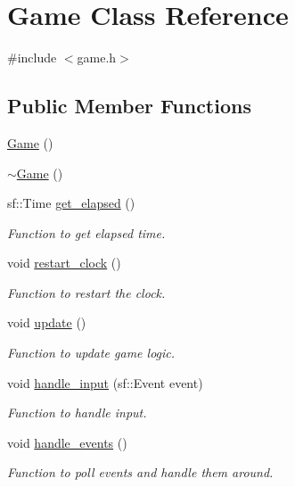\hypertarget{class_game}{}\section{Game Class Reference}
\label{class_game}


{\ttfamily \#include $<$game.\+h$>$}

\subsection*{Public Member Functions}
\begin{DoxyCompactItemize}
\item 
\hyperlink{class_game_ad59df6562a58a614fda24622d3715b65}{Game} ()
\item 
\hyperlink{class_game_ae3d112ca6e0e55150d2fdbc704474530}{$\sim$\+Game} ()
\item 
sf\+::\+Time \hyperlink{class_game_a4924f7fafddc76b267d1dc9138fa07d0}{get\+\_\+elapsed} ()
\begin{DoxyCompactList}\small\item\em Function to get elapsed time. \end{DoxyCompactList}\item 
void \hyperlink{class_game_a528bf1006e9dfed3b51d9aae79f8c287}{restart\+\_\+clock} ()
\begin{DoxyCompactList}\small\item\em Function to restart the clock. \end{DoxyCompactList}\item 
void \hyperlink{class_game_a79df6376b332d63c9eca0dcee30305c3}{update} ()
\begin{DoxyCompactList}\small\item\em Function to update game logic. \end{DoxyCompactList}\item 
void \hyperlink{class_game_af7895911bb1509fbb33cc1b979c852b8}{handle\+\_\+input} (sf\+::\+Event event)
\begin{DoxyCompactList}\small\item\em Function to handle input. \end{DoxyCompactList}\item 
void \hyperlink{class_game_a698430daa658033e7746e3a161a859a9}{handle\+\_\+events} ()
\begin{DoxyCompactList}\small\item\em Function to poll events and handle them around. \end{DoxyCompactList}\item 

\end{DoxyCompactItemize}
